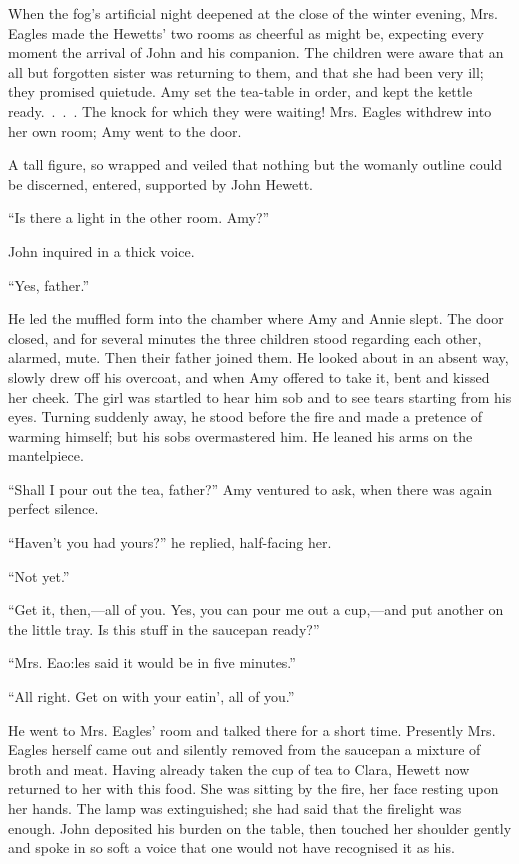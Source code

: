 When the fog's artificial night deepened at the close of the winter
evening, Mrs. Eagles made the Hewetts' two rooms as cheerful as might
be, expecting every moment the arrival of John and his companion. The
children were aware that an all but forgotten sister was returning to
them, and that she had been very ill; they promised quietude. Amy set
the tea-table in order, and kept the kettle ready{.~.~.~.} The knock for
which they were waiting! Mrs. Eagles withdrew into her own room; Amy
went to the door.

{\protect\hypertarget{297}{}{}}A tall figure, so wrapped and veiled that
nothing but the womanly outline could be discerned, entered, supported
by John Hewett.

``Is there a light in the other room. Amy?''

John inquired in a thick voice.

``Yes, father.''

He led the muffled form into the chamber where Amy and Annie slept. The
door closed, and for several minutes the three children stood regarding
each other, alarmed, mute. Then their father joined them. He looked
about in an absent way, slowly drew off his overcoat, and when Amy
offered to take it, bent and kissed her cheek. The girl was startled to
hear him sob and to see tears starting from his eyes. Turning suddenly
away, he stood before the fire and made a pretence of warming himself;
but his sobs overmastered him. He leaned his arms on the mantelpiece.

``Shall I pour out the tea, father?'' Amy ventured to ask, when there
was again perfect silence.

{\protect\hypertarget{298}{}{}}``Haven't you had yours?'' he replied,
half-facing her.

``Not yet.''

``Get it, then,---all of you. Yes, you can pour me out a cup,---and put
another on the little tray. Is this stuff in the saucepan ready?''

``Mrs. Eao:les said it would be in five minutes.''

``All right. Get on with your eatin', all of you.''

He went to Mrs. Eagles' room and talked there for a short time.
Presently Mrs. Eagles herself came out and silently removed from the
saucepan a mixture of broth and meat. Having already taken the cup of
tea to Clara, Hewett now returned to her with this food. She was sitting
by the fire, her face resting upon her hands. The lamp was extinguished;
she had said that the firelight was enough. John deposited his burden on
the table, then touched her shoulder gently and spoke in so soft a voice
that one would not have recognised it as his.

